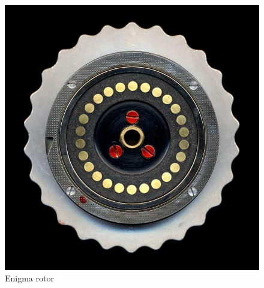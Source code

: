 \begin{figure}[H]
\begin{minipage}{0.48\textwidth}
    \vspace{4mm} %
    \includegraphics[width=0.8\linewidth]{paper/images/exit.jpg}
  \end{minipage}
  \caption{Enigma rotor}
  \label{fig:rotors}
\end{figure}

